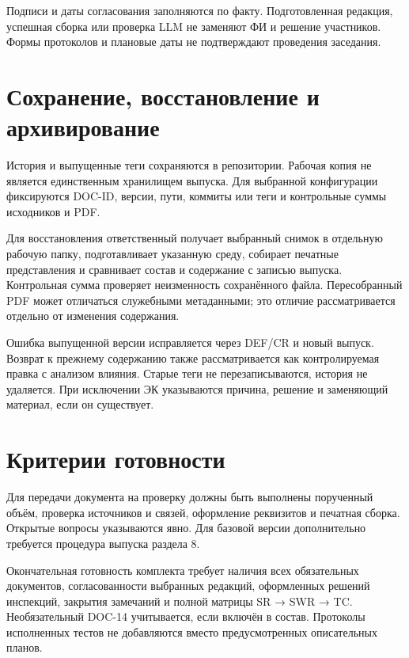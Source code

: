 \documentclass[12pt,a4paper]{article}
\begin{document}
Подписи и даты согласования заполняются по факту. Подготовленная редакция, успешная сборка или проверка LLM не заменяют ФИ и решение участников. Формы протоколов и плановые даты не подтверждают проведения заседания.

\section{Сохранение, восстановление и архивирование}\label{9-ux441ux43eux445ux440ux430ux43dux435ux43dux438ux435-ux432ux43eux441ux441ux442ux430ux43dux43eux432ux43bux435ux43dux438ux435-ux438-ux430ux440ux445ux438ux432ux438ux440ux43eux432ux430ux43dux438ux435}

\hypertarget{9-сохранение-восстановление-и-архивирование}{}

История и выпущенные теги сохраняются в репозитории. Рабочая копия не является единственным хранилищем выпуска. Для выбранной конфигурации фиксируются DOC-ID, версии, пути, коммиты или теги и контрольные суммы исходников и PDF.

Для восстановления ответственный получает выбранный снимок в отдельную рабочую папку, подготавливает указанную среду, собирает печатные представления и сравнивает состав и содержание с записью выпуска. Контрольная сумма проверяет неизменность сохранённого файла. Пересобранный PDF может отличаться служебными метаданными; это отличие рассматривается отдельно от изменения содержания.

Ошибка выпущенной версии исправляется через DEF/CR и новый выпуск. Возврат к прежнему содержанию также рассматривается как контролируемая правка с анализом влияния. Старые теги не перезаписываются, история не удаляется. При исключении ЭК указываются причина, решение и заменяющий материал, если он существует.

\section{Критерии готовности}\label{10-ux43aux440ux438ux442ux435ux440ux438ux438-ux433ux43eux442ux43eux432ux43dux43eux441ux442ux438}

\hypertarget{10-критерии-готовности}{}

Для передачи документа на проверку должны быть выполнены порученный объём, проверка источников и связей, оформление реквизитов и печатная сборка. Открытые вопросы указываются явно. Для базовой версии дополнительно требуется процедура выпуска раздела 8.

Окончательная готовность комплекта требует наличия всех обязательных документов, согласованности выбранных редакций, оформленных решений инспекций, закрытия замечаний и полной матрицы SR → SWR → TC. Необязательный DOC-14 учитывается, если включён в состав. Протоколы исполненных тестов не добавляются вместо предусмотренных описательных планов.
\end{document}
